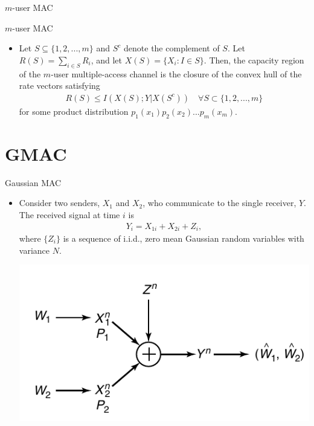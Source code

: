 \documentclass{beamer}
\begin{document}
{\begin{frame}{$m$-user MAC}
\end{frame}
\begin{frame}{$m$-user MAC} 

\begin{itemize}
\item<1-> \begin{tcolorbox}[colback=blue!10, colframe=blue, title=Theorem for Capacity Region of $m$-MAC]
Let $S \subseteq \{1,2,...,m\}$ and $S^c$ denote the complement of $S$. Let $R(S)=\sum_{i \in S} R_i$, and let $X(S)=\{X_i: I \in S \}$. Then, the capacity region of the $m$-user multiple-access channel is the closure of the convex hull of the rate vectors satisfying
%
\begin{eqnarray*}
    R(S) \leq I(X(S);Y|X(S^c)) \quad \forall S \subset \{1,2,...,m\}
\end{eqnarray*}
%
for some product distribution $p_1(x_1)p_2(x_2)...p_m(x_m)$.
\end{tcolorbox}
    \end{itemize}

\end{frame}
\section{GMAC}

\begin{frame}{Gaussian MAC}
 \begin{itemize}
	\justifying

\item<1-> Consider two senders, $X_1$ and $X_2$, who communicate to the single receiver, $Y$. The received signal at time $i$ is
%
\begin{eqnarray*}
    Y_i = X_{1i}+X_{2i}+Z_i,
\end{eqnarray*}
%
where $\{Z_i\}$ is a sequence of i.i.d., zero mean Gaussian random variables with variance $N$.

\begin{center}
    \includegraphics[scale = 0.3]{Diagrams/GMAC.png}
\end{center}


\end{itemize}
\end{frame}}
\end{document}
